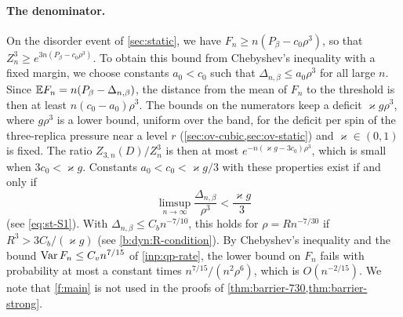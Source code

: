 \paragraph{The denominator.} On the disorder event of \cref{sec:static}, we
have $F_n\ge n(P_\beta-c_0\rho^3)$, so that
$Z_n^3\ge e^{3n(P_\beta-c_0\rho^3)}$. To obtain this bound from
Chebyshev's inequality with a fixed margin, we choose constants
$a_0<c_0$ such that $\Delta_{n,\beta}\le a_0\rho^3$
for all large $n$. Since $\mathbb E F_n=n(P_\beta-\Delta_{n,\beta})$, the distance from
the mean of $F_n$ to the threshold is then at least
$n(c_0-a_0)\rho^3$. The bounds on the numerators keep a deficit
$\varkappa g\rho^3$, where $g\rho^3$ is a lower bound, uniform over the band, for the
deficit per spin of the three-replica pressure near a level $r$
(\cref{sec:ov-cubic,sec:ov-static}) and $\varkappa\in(0,1)$ is fixed. The ratio
$Z_{3,n}(D)/Z_n^3$ is then at most $e^{-n(\varkappa g-3c_0)\rho^3}$, which is
small when $3c_0<\varkappa g$. Constants $a_0<c_0<\varkappa g/3$
with these properties exist if and only if
\[
 \limsup_{n\to\infty}\frac{\Delta_{n,\beta}}{\rho^3}<\frac{\varkappa g}3
\]
(see \eqref{eq:st-S1}). With $\Delta_{n,\beta}\le C_bn^{-7/10}$, this holds
for $\rho=Rn^{-7/30}$ if $R^3>3C_b/(\varkappa g)$ (see
\eqref{b:dyn:R-condition}). By Chebyshev's inequality and the bound
$\operatorname{Var} F_n\le C_vn^{7/15}$ of \cref{inp:qp-rate}, the lower bound on $F_n$ fails
with probability at most a constant times $n^{7/15}/(n^2\rho^6)$, which is
$O(n^{-2/15})$. We note that \cref{f:main} is not used in the proofs of
\cref{thm:barrier-730,thm:barrier-strong}.

